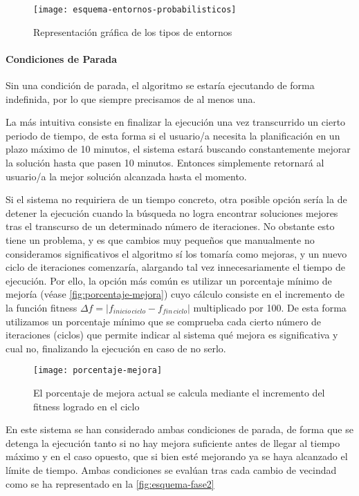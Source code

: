 \begin{figure}
    \centering    \texttt{[image: esquema-entornos-probabilisticos]}
    \caption{Representación gráfica de los tipos de entornos}
    \label{fig:esquema-entornos-probabilisticos}
\end{figure}


\paragraph{Condiciones de Parada}
\label{apartado:condiciones-parada}

Sin una condición de parada, el algoritmo se estaría ejecutando de forma indefinida, por lo que siempre precisamos de al menos una.

La más intuitiva consiste en finalizar la ejecución una vez transcurrido un cierto periodo de tiempo, de esta forma si el usuario/a necesita la planificación en un plazo máximo de 10 minutos, el sistema estará buscando constantemente mejorar la solución hasta que pasen 10 minutos. Entonces simplemente retornará al usuario/a la mejor solución alcanzada hasta el momento.

Si el sistema no requiriera de un tiempo concreto, otra posible opción sería la de detener la ejecución cuando la búsqueda no logra encontrar soluciones mejores tras el transcurso de un determinado número de iteraciones. No obstante esto tiene un problema, y es que cambios muy pequeños que manualmente no consideramos significativos el algoritmo sí los tomaría como mejoras, y un nuevo ciclo de iteraciones comenzaría, alargando tal vez innecesariamente el tiempo de ejecución. Por ello, la opción más común es utilizar un porcentaje mínimo de mejoría (véase \autoref{fig:porcentaje-mejora}) cuyo cálculo consiste en el incremento de la función fitness $\Delta f = |f_{inicio\, ciclo}-f_{fin\, ciclo}|$ multiplicado por 100. De esta forma utilizamos un porcentaje mínimo que se comprueba cada cierto número de iteraciones (ciclos) que permite indicar al sistema qué mejora es significativa y cual no, finalizando la ejecución en caso de no serlo.

\begin{figure}
    \centering
    \texttt{[image: porcentaje-mejora]}
    \caption{El porcentaje de mejora actual se calcula mediante el incremento del fitness logrado en el ciclo}
    \label{fig:porcentaje-mejora}
\end{figure}

En este sistema se han considerado ambas condiciones de parada, de forma que se detenga la ejecución tanto si no hay mejora suficiente antes de llegar al tiempo máximo y en el caso opuesto, que si bien esté mejorando ya se haya alcanzado el límite de tiempo. Ambas condiciones se evalúan tras cada cambio de vecindad como se ha representado en la \autoref{fig:esquema-fase2}

